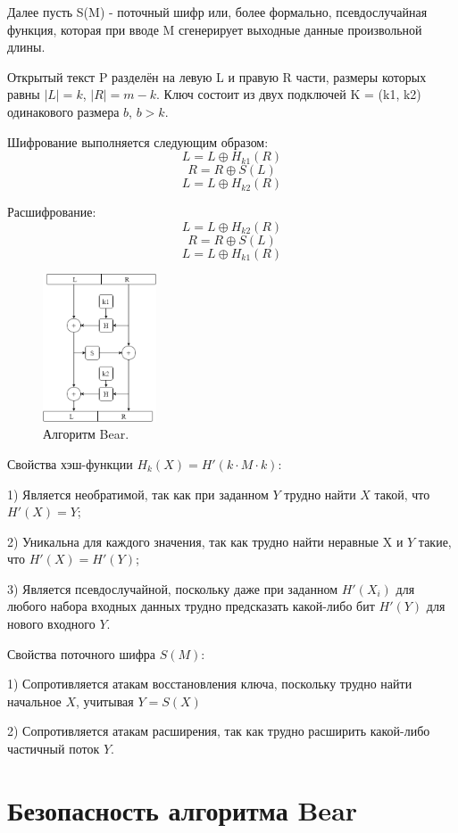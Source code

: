 \documentclass[12pt]{article}
\begin{document}
Далее пусть S(M) - поточный шифр или, более формально, псевдослучайная функция, которая при вводе M сгенерирует выходные данные произвольной длины.

Открытый текст P разделён на левую L и правую R части, размеры которых равны $|L| = k$, $|R| = m - k$. Ключ состоит из двух подключей K = (k1, k2) одинакового размера $b$, $b > k$.

Шифрование выполняется следующим образом:
\[L = L\oplus H_{k1}(R)\]
\[R = R\oplus S(L)\]
\[L = L\oplus H_{k2}(R)\]

Расшифрование:
\[L = L\oplus H_{k2}(R)\]
\[R = R\oplus S(L)\]
\[L = L\oplus H_{k1}(R)\]


\begin{figure}
\centering
\includegraphics[width=0.3\textwidth]{Bear.png}
\caption{\label{fig:Bear}Алгоритм Bear.}
\end{figure}
\vspace{5mm}
Свойства хэш-функции $H_{k}(X) = {H'(k\cdot M \cdot k)}$:

    1) Является необратимой, так как при заданном $Y$ трудно найти $X$ такой, что $H'(X) = Y$;
   
    2) Уникальна для каждого значения, так как трудно найти неравные X и $Y$ такие, что $H'(X) = H'(Y)$;
    
    3) Является псевдослучайной, поскольку даже при заданном $H'(X_{i})$ для любого набора входных данных трудно предсказать какой-либо бит $H'(Y)$ для нового входного $Y$.
\vspace{5mm}

Свойства поточного шифра $S(M)$:

    1) Сопротивляется атакам восстановления ключа, поскольку трудно найти начальное $X$, учитывая $Y = S(X)$
    
    2) Сопротивляется атакам расширения, так как трудно расширить какой-либо частичный поток $Y$.

\section{Безопасность алгоритма Bear} 
\end{document}
